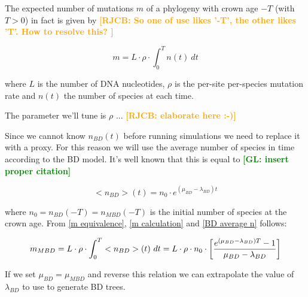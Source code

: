 \documentclass{article}
\newcommand*\richel[1]{\textcolor{orange}{\textbf{[RJCB: #1]}}}
\newcommand*\gio[1]{\textcolor{green}{\textbf{[GL: #1]}}}
\begin{document}
\begin{itemize}
The expected number of mutations $m$ of a phylogeny 
with crown age $-T$ (with $T>0$) in fact is given by
\richel{
  So one of use likes '-T', the other likes 'T'. How to resolve this?
}

\begin{equation}
m = L \cdot \rho \cdot \int_{0}^{T} n(t)\ dt \label{m calculation}
\end{equation}

where $L$ is the number of DNA nucleotides, 
$\rho$ is the per-site per-species mutation rate and
$n(t)$ the number of species at each time.

The parameter we'll tune is $\rho$ ... \richel{elaborate here :-)}

Since we cannot know $n_{BD}(t)$ before running simulations
we need to replace it with a proxy. 
For this reason we will use the average number of
species in time according to the BD model. 
It's well known that this is equal to \gio{insert proper citation}

\begin{equation}
    <n_{BD}>(t) = n_{0} \cdot e^{(\mu_{BD} - \lambda_{BD})t} \label{BD average n}
\end{equation}

where $n_{0} = n_{BD}(-T) = n_{MBD}(-T)$ is the initial number of species 
at the crown age.
From \ref{m equivalence}, \ref{m calculation} and \ref{BD average n} follows:

\begin{equation}
m_{MBD} = L \cdot \rho \cdot \int_{0}^{T} <n_{BD}>(t)\ dt \\
= L \cdot \rho \cdot n_{0} \cdot \left[ \frac{e^{(\mu_{BD} - \lambda_{BD})T} - 1}{\mu_{BD} - \lambda_{BD}} \right]
\end{equation}

If we set $\mu_{BD} = \mu_{MBD}$ and reverse this relation 
we can extrapolate the value of $\lambda_{BD}$ to use to generate BD trees.


\end{itemize}
\end{document}
